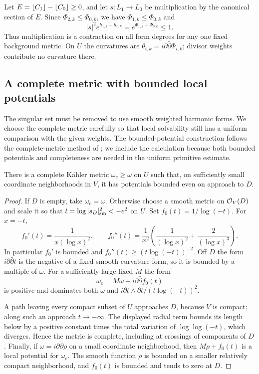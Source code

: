 Let $E=\lfloor C_1\rfloor-\lfloor C_0\rfloor\ge0$, and let
$s:L_1\to L_0$ be multiplication by the canonical section of $E$.
Since $\Phi_{2,k}\le\Phi_{0,k}$, we have
$\Phi_{1,k}\le\Phi_{0,k}$ and
\begin{equation}\label{eq:multiplication-contraction}
 |s|^2e^{h_{1,k}-h_{0,k}}
 =e^{\Phi_{1,k}-\Phi_{0,k}}\le1.
\end{equation}
Thus multiplication is a contraction on all form degrees for any one
fixed background metric.  On $U$ the curvatures are
$\theta_{i,k}=i\partial\bar\partial\Phi_{i,k}$; divisor weights
contribute no curvature there.

\subsection{A complete metric with bounded local potentials}

The singular set must be removed to use smooth weighted harmonic
forms.  We choose the complete metric carefully so that local
solvability still has a uniform comparison with the given weights.
The bounded-potential construction follows the complete-metric method
of \cite[Lemma~3.1]{FujinoInjectivity2012}; we include the calculation
because both bounded potentials and completeness are needed in the
uniform primitive estimate.

\begin{lemma}\label{lem:bounded-potential-complete-metric}
There is a complete K\"ahler metric $\omega_c\ge\omega$ on $U$ such
that, on sufficiently small coordinate neighborhoods in $V$, it has
potentials bounded even on approach to $D$.
\end{lemma}

\begin{proof}
If $D$ is empty, take $\omega_c=\omega$.  Otherwise choose a smooth
metric on $\mathcal O_V(D)$ and scale it so that
$t=\log|s_D|_{\rm sm}^2<-e^2$ on $U$.  Set $f_0(t)=1/\log(-t)$.
For $x=-t$,
\[
 f_0'(t)=\frac1{x(\log x)^2},\qquad
 f_0''(t)=\frac1{x^2}\left(\frac1{(\log x)^2}
                          +\frac2{(\log x)^3}\right).
\]
In particular $f_0'$ is bounded and
$f_0''(t)\ge(t\log(-t))^{-2}$.  Off $D$ the form
$i\partial\bar\partial t$ is the negative of a fixed smooth
curvature form, so it is bounded by a multiple of $\omega$.  For a
sufficiently large fixed $M$ the form
\[
 \omega_c=M\omega+i\partial\bar\partial f_0(t)
\]
is positive and dominates both $\omega$ and
$i\partial t\wedge\bar\partial t/(t\log(-t))^2$.

A path leaving every compact subset of $U$ approaches $D$, because
$V$ is compact; along such an approach $t\to-\infty$.  The displayed
radial term bounds its length below by a positive constant times the
total variation of $\log\log(-t)$, which diverges.  Hence the metric
is complete, including at crossings of components of $D$.  Finally,
if $\omega=i\partial\bar\partial\rho$ on a small coordinate
neighborhood, then $M\rho+f_0(t)$ is a local potential for $\omega_c$.
The smooth function $\rho$ is bounded on a smaller relatively compact
neighborhood, and $f_0(t)$ is bounded and tends to zero at $D$.
\end{proof}

